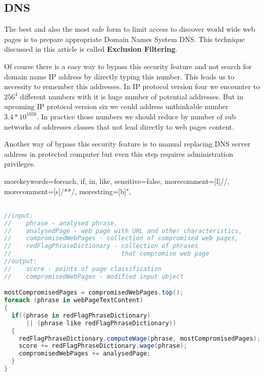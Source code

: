 \documentclass[9pt,a4paper]{extarticle}
\begin{document}
\begin{multicols}{2}
\section{DNS}
The best and also the most safe form to limit access to discover world wide web pages is to prepare appropriate Domain Names System DNS\cite{j._postel_domain_1984, p._mockapetris_domain_1987, p._mockapetris_domain2_1987, yakov_rekhter_dynamic_1997, r._elz_clarifications_1997, d._eastlake_3rd_domain_1997}. This technique discussed in this article is called \textbf{Exclusion Filtering}\cite{paul_greenfield_netalert_2001}.

Of course there is a easy way to bypass this security feature and not search for domain name IP address by directly typing this number. This leads us to necessity to remember this addresses. In IP protocol version four we encounter to \({256}^{4}\) different numbers with it is huge number of potential addresses. But in upcoming IP protocol version six we could address unthinkable number \(3.4*10^{1038}\). In practice those numbers we should reduce by number of sub networks of addresses classes that not lead directly to web pages content.

Another way of bypass this security feature is to manual replacing DNS server address in protected computer but even this step requires administration privileges.

\end{multicols}

%
 {morekeywords={foreach, if, in, like}, sensitive=false, morecomment=[l]{//}, morecomment=[s]{/*}{*/}, morestring=[b]", }
\lstset{
numbers=left, numberstyle=\tiny, stepnumber=1, numbersep=5pt
}
\begin{lstlisting}[title={Alg 1. The basic Internet web page classifier algorithm}, language=csharp, label=alg1] 

//input: 
//    phrase - analysed phrase, 
//    analysedPage - web page with URL and other characteristics, 
//    compromisedWebPages - collection of compromised web pages, 
//    redFlagPhraseDictionary - collection of phrases 
//                              that compromise web page
//output:
//    score - points of page classification
//    compromisedWebPages - modified input object

mostCompromisedPages = compromisedWebPages.top();
foreach (phrase in webPageTextContent)
{  
  if((phrase in redFlagPhraseDictionary) 
      || (phrase like redFlagPhraseDictionary))
  {
    redFlagPhraseDictionary.computeWage(phrase, mostCompromisedPages);
    score += redFlagPhraseDictionary.wage(phrase);
    compromisedWebPages += analysedPage;
  }
}
\end{lstlisting}
\end{document}
